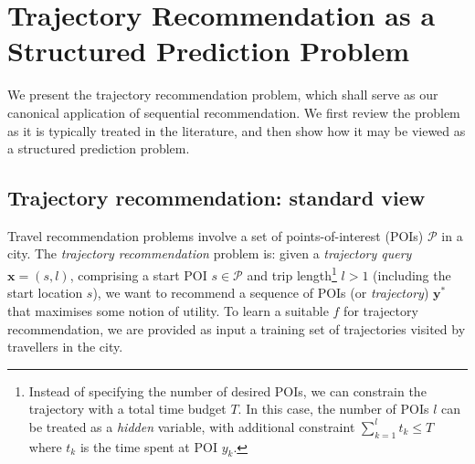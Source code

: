 
\secmoveup
\section{Trajectory Recommendation as a Structured Prediction Problem}
\label{sec:trajrec}
\textmoveup

We present the trajectory recommendation problem,
which shall serve as our canonical application of sequential recommendation.
We first review the problem as it is typically treated in the literature,
and then show how it may be viewed as a structured prediction problem.

\secmoveup
\subsection{Trajectory recommendation: standard view}

Travel recommendation problems involve a set of points-of-interest (POIs) $\mathcal{P}$ in a city.
The \emph{trajectory recommendation} problem is: given a \emph{trajectory query} $\mathbf{x} = (s, l)$,
comprising a start POI $s \in \mathcal{P}$ and trip length\footnote{Instead of specifying the number of desired POIs, we can constrain the trajectory with a total time budget $T$. In this case, the number of POIs $l$ can be treated as a \emph{hidden} variable, with additional constraint $\sum_{k=1}^l t_k \le T$ where $t_k$ is the time spent at POI $y_k$.}
$l > 1$ (including the start location $s$),
we want to recommend a sequence of POIs (or \emph{trajectory}) $\mathbf{y}^*$ that maximises some notion of utility.
To learn a suitable $f$ for trajectory recommendation,
we are provided as input a training set
of trajectories visited by travellers in the city.

%

